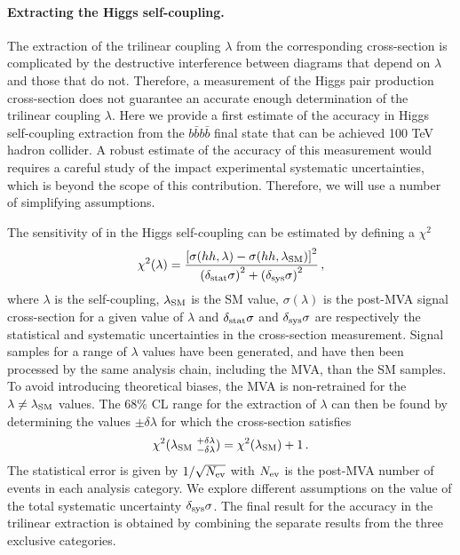 \documentclass[a4paper,11pt]{article}
\newcommand{\be}{\begin{equation}}
\newcommand{\ee}{\end{equation}}
\newcommand{\lc}{\left[}
\newcommand{\rc}{\right]}
\newcommand{\lp}{\left(}
\newcommand{\rp}{\right)}
\begin{document}
\paragraph{Extracting the Higgs self-coupling.}  The extraction of the trilinear coupling $\lambda$ from the
  corresponding cross-section is complicated by the
  destructive interference
  between diagrams that depend on $\lambda$ and those that do not.
  Therefore, a measurement of the Higgs pair production
  cross-section does not guarantee an accurate enough determination of the trilinear
  coupling $\lambda$.
 Here we provide a first estimate of the accuracy
  in Higgs self-coupling extraction from the $b\bar{b}b\bar{b}$ final state
  that can be achieved 100 TeV hadron collider.
  A robust estimate of the accuracy of this measurement would requires
  a careful study of the impact 
  experimental systematic uncertainties, which is beyond the scope of this contribution.
  Therefore, we will use a number of simplifying assumptions.

  The sensitivity of in the Higgs self-coupling can be estimated by defining a $\chi^2$
  \be
  \label{eq:chi2profile}
  \chi^2(\lambda) = \frac{\lc \sigma(hh,\lambda) - \sigma(hh,\lambda_{\rm SM})
    \rc^2}{\lp \delta_{\rm stat}\sigma\rp^2+\lp \delta_{\rm sys}\sigma\rp^2 } \, ,
  \ee
  where $\lambda$ is the self-coupling, $\lambda_{\rm SM}$ is the SM value, $\sigma(\lambda)$ is the
  post-MVA signal cross-section for a given value of $\lambda$ and $\delta_{\rm stat}\sigma$ and
  $\delta_{\rm sys}\sigma$ are respectively the statistical and systematic uncertainties in the cross-section
  measurement.
  Signal samples for a range of $\lambda$ values have been generated, and have then been processed
  by the same analysis chain, including the MVA, than the SM samples.
  To avoid introducing theoretical biases, the MVA is non-retrained for the $\lambda\ne \lambda_{\rm SM}$ values.
  The 68\% CL range for the extraction of $\lambda$ can then be found by determining the values $\pm \delta\lambda$
  for which the cross-section satisfies
  \be
  \label{eq:condition}
\chi^2(\lambda_{\rm SM}~^{+\delta\lambda}_{-\delta\lambda})=\chi^2(\lambda_{\rm SM})+1 \, .
\ee
The statistical error is given by $1/\sqrt{N_{\rm ev}}$ with $N_{\rm ev}$ is the post-MVA number of events in each analysis
category.
%
We explore different assumptions on the value of the total systematic uncertainty $\delta_{\rm sys}\sigma$.
%
The final result for the accuracy in the trilinear extraction is obtained by combining the separate results
from the three exclusive categories.
\end{document}
